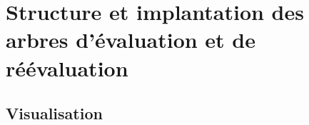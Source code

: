 \section{Structure et implantation des arbres d'évaluation et de réévaluation}
\label{sec:implantation-arbre}

\subsection{Visualisation}
\label{sec:implantation-visualisation-arbres}

